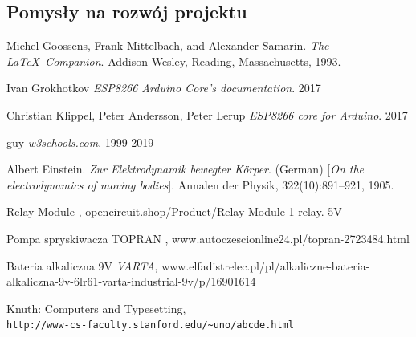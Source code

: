 \documentclass[12pt]{article}
\begin{document}
\subsection{Pomysły na rozwój projektu}
\begin{thebibliography}{9}


Michel Goossens, Frank Mittelbach, and Alexander Samarin. 
\textit{The \LaTeX\ Companion}. 
Addison-Wesley, Reading, Massachusetts, 1993.

Ivan Grokhotkov
\textit{ESP8266 Arduino Core’s documentation}. 
2017

Christian Klippel, Peter Andersson, Peter Lerup
\textit{ESP8266 core for Arduino}. 
2017

guy
\textit{w3schools.com}. 
1999-2019
 
Albert Einstein. 
\textit{Zur Elektrodynamik bewegter K{\"o}rper}. (German) 
[\textit{On the electrodynamics of moving bodies}]. 
Annalen der Physik, 322(10):891–921, 1905.

 Relay Module
\emph{},
opencircuit.shop/Product/Relay-Module-1-relay.-5V

 Pompa spryskiwacza TOPRAN
\emph{},
www.autoczescionline24.pl/topran-2723484.html



 Bateria alkaliczna 9V 
\emph{VARTA},
www.elfadistrelec.pl/pl/alkaliczne-bateria-alkaliczna-9v-6lr61-varta-industrial-9v/p/16901614


 
Knuth: Computers and Typesetting,
\\\texttt{http://www-cs-faculty.stanford.edu/\~{}uno/abcde.html}
\end{thebibliography}
\end{document}
